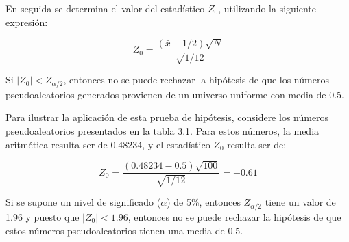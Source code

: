 \documentclass[11pt,letterpaper]{report}
\begin{document}
En seguida se determina el valor del estadístico $Z_0$, utilizando la
siguiente expresión:

\begin{equation}
Z_0 = \frac{(\bar{x} - 1/2)\sqrt{N}}{\sqrt{1/12}}
\end{equation}

Si $|Z_0| < Z_{\alpha/2}$, entonces no se puede rechazar la hipótesis de
que los números pseudoaleatorios generados provienen de un universo
uniforme con media de 0.5.

Para ilustrar la aplicación de esta prueba de hipótesis, considere los
números pseudoaleatorios presentados en la tabla 3.1. Para estos
números, la media aritmética resulta ser de 0.48234, y el estadístico
$Z_0$ resulta ser de:

\begin{equation}
Z_0 = \frac{(0.48234 - 0.5)\sqrt{100}}{\sqrt{1/12}} = -0.61
\end{equation}

Si se supone un nivel de significado ($\alpha$) de 5\%, entonces
$Z_{\alpha/2}$ tiene un valor de 1.96 y puesto que $|Z_0| < 1.96$,
entonces no se puede rechazar la hipótesis de que estos números
pseudoaleatorios tienen una media de 0.5.
\end{document}
